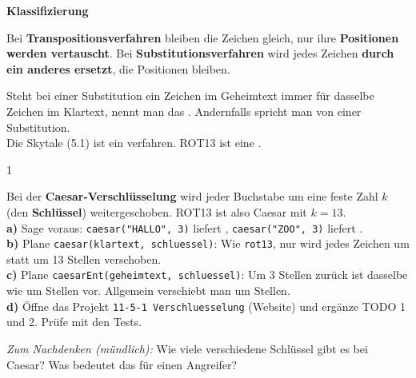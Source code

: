 \documentclass[11pt,a4paper]{article}
\begin{document}

\textbf{Klassifizierung}\par\vspace{1mm}
\begin{minipage}[c]{0.5\linewidth}
\centering
{}
\end{minipage}\hfill
\begin{minipage}[c]{0.47\linewidth}
Bei \textbf{Transpositionsverfahren} bleiben die Zeichen gleich, nur ihre \textbf{Positionen werden vertauscht}. Bei \textbf{Substitutionsverfahren} wird jedes Zeichen \textbf{durch ein anderes ersetzt}, die Positionen bleiben.
\end{minipage}\par\vspace{1mm}
{\lueckentext Steht bei einer Substitution ein Zeichen im Geheimtext immer für dasselbe Zeichen im Klartext, nennt man das . Andernfalls spricht man von einer  Substitution.\\
Die Skytale (5.1) ist ein verfahren. ROT13 ist eine .\par}

\begin{aufgabe}{1}
{\lueckentext Bei der \textbf{Caesar-Verschlüsselung} wird jeder Buchstabe um eine feste Zahl $k$ (den \textbf{Schlüssel}) weitergeschoben. ROT13 ist also Caesar mit $k = 13$.\\
\textbf{a)} Sage voraus: \texttt{caesar("HALLO", 3)} liefert , \texttt{caesar("ZOO", 3)} liefert .\\
\textbf{b)} Plane \texttt{caesar(klartext, schluessel)}: Wie \texttt{rot13}, nur wird jedes Zeichen um  statt um 13 Stellen verschoben.\\
\textbf{c)} Plane \texttt{caesarEnt(geheimtext, schluessel)}: Um 3 Stellen zurück ist dasselbe wie um  Stellen vor. Allgemein verschiebt man um  Stellen.\\
\textbf{d)} Öffne das Projekt \texttt{11-5-1 Verschluesselung} (Website) und ergänze TODO 1 und 2. Prüfe mit den Tests.\par}
\textit{Zum Nachdenken (mündlich):} Wie viele verschiedene Schlüssel gibt es bei Caesar? Was bedeutet das für einen Angreifer?
\end{aufgabe}
\end{document}

